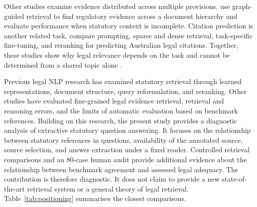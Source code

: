 \documentclass[pdflatex,sn-basic]{sn-jnl}%
\theoremstyle{thmstyleone}%
\theoremstyle{thmstyletwo}%
\theoremstyle{thmstylethree}%
\begin{document}
Other studies examine evidence distributed across multiple provisions.
\citet{chaeStructureAwareStatuteQA2026} use graph-guided retrieval to find
regulatory evidence across a document hierarchy and evaluate performance when
statutory context is incomplete. Citation prediction is another related task.
\citet{han2026legal} compare prompting, sparse and dense retrieval,
task-specific fine-tuning, and reranking for predicting Australian legal
citations. Together, these studies show why legal relevance depends on the
task and cannot be determined from a shared topic alone
\citep{vsavelka2022legal,van2017concept}.

Previous legal NLP research has examined statutory retrieval through learned
representations, document structure, query reformulation, and reranking. Other
studies have evaluated fine-grained legal evidence retrieval, retrieval and
reasoning errors, and the limits of automatic evaluation based on benchmark
references. Building on this research, the present study provides a diagnostic
analysis of extractive statutory question answering. It focuses on the
relationship between statutory references in questions, availability of the
annotated source, source selection, and answer extraction under a fixed reader.
Controlled retrieval comparisons and an 80-case human audit provide additional
evidence about the relationship between benchmark agreement and assessed legal
adequacy. The contribution is therefore diagnostic. It does not claim to
provide a new state-of-the-art retrieval system or a general theory of legal
retrieval. Table~\ref{tab:positioning} summarises the closest comparisons.
\end{document}
